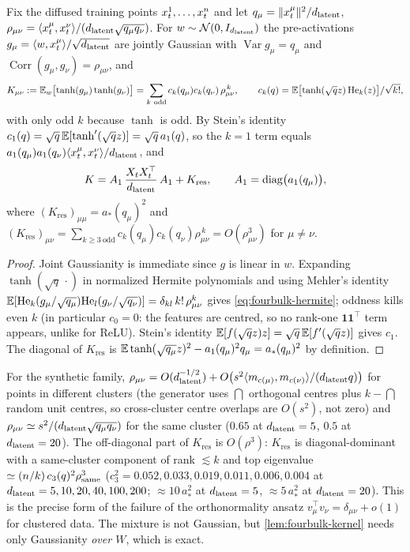 \begin{lemma}\label{lem:fourbulk-kernel}
Fix the diffused training points $x_t^1,\dots,x_t^n$ and let $q_\mu=\|x_t^\mu\|^2/d_{\mathrm{latent}}$, $\rho_{\mu\nu}=\langle x_t^\mu,x_t^\nu\rangle/(d_{\mathrm{latent}}\sqrt{q_\mu q_\nu})$. For $w\sim\mathcal N(0,I_{d_{\mathrm{latent}}})$ the pre-activations $g_\mu=\langle w,x_t^\mu\rangle/\sqrt{d_{\mathrm{latent}}}$ are jointly Gaussian with $\operatorname{Var}g_\mu=q_\mu$ and $\operatorname{Corr}(g_\mu,g_\nu)=\rho_{\mu\nu}$, and
\begin{equation}\label{eq:fourbulk-hermite}
  K_{\mu\nu}:=\mathbb{E}_w\bigl[\tanh(g_\mu)\tanh(g_\nu)\bigr]
  =\sum_{k\ \mathrm{odd}} c_k(q_\mu)c_k(q_\nu)\,\rho_{\mu\nu}^{\,k},\qquad
  c_k(q)=\mathbb{E}\bigl[\tanh(\sqrt q z)\,\mathrm{He}_k(z)\bigr]/\sqrt{k!},
\end{equation}
with only odd $k$ because $\tanh$ is odd. By Stein's identity $c_1(q)=\sqrt q\,\mathbb{E}[\tanh'(\sqrt q z)]=\sqrt q\,a_1(q)$, so the $k=1$ term equals $a_1(q_\mu)a_1(q_\nu)\langle x_t^\mu,x_t^\nu\rangle/d_{\mathrm{latent}}$, and
\begin{equation}\label{eq:fourbulk-Ksplit}
  K = A_1\,\frac{X_tX_t^\top}{d_{\mathrm{latent}}}\,A_1 + K_{\mathrm{res}},\qquad A_1=\operatorname{diag}\bigl(a_1(q_\mu)\bigr),
\end{equation}
where $(K_{\mathrm{res}})_{\mu\mu}=a_*(q_\mu)^2$ and $(K_{\mathrm{res}})_{\mu\nu}=\sum_{k\ge3\ \mathrm{odd}}c_k(q_\mu)c_k(q_\nu)\rho_{\mu\nu}^{\,k}=O(\rho_{\mu\nu}^3)$ for $\mu\ne\nu$.
\end{lemma}
\begin{proof}
Joint Gaussianity is immediate since $g$ is linear in $w$. Expanding $\tanh(\sqrt{q}\,\cdot)$ in normalized Hermite polynomials and using Mehler's identity $\mathbb{E}[\mathrm{He}_k(g_\mu/\sqrt{q_\mu})\mathrm{He}_l(g_\nu/\sqrt{q_\nu})]=\delta_{kl}\,k!\,\rho_{\mu\nu}^k$ gives \eqref{eq:fourbulk-hermite}; oddness kills even $k$ (in particular $c_0=0$: the features are centred, so no rank-one $\mathbf 1\mathbf 1^\top$ term appears, unlike for ReLU). Stein's identity $\mathbb{E}[f(\sqrt q z)z]=\sqrt q\,\mathbb{E}[f'(\sqrt q z)]$ gives $c_1$. The diagonal of $K_{\mathrm{res}}$ is $\mathbb{E}\tanh(\sqrt{q_\mu}z)^2-a_1(q_\mu)^2q_\mu=a_*(q_\mu)^2$ by definition.
\end{proof}

For the synthetic family, $\rho_{\mu\nu}=O(d_{\mathrm{latent}}^{-1/2})+O\bigl(s^2\langle m_{c(\mu)},m_{c(\nu)}\rangle/(d_{\mathrm{latent}} q)\bigr)$ for points in different clusters (the generator uses $\dint$ orthogonal centres plus $k-\dint$ random unit centres, so cross-cluster centre overlaps are $O(s^2)$, not zero) and $\rho_{\mu\nu}\simeq s^2/(d_{\mathrm{latent}}\sqrt{q_\mu q_\nu})$ for the same cluster ($0.65$ at $d_{\mathrm{latent}}=5$, $0.5$ at $d_{\mathrm{latent}}=20$). The off-diagonal part of $K_{\mathrm{res}}$ is $O(\rho^3)$: $K_{\mathrm{res}}$ is diagonal-dominant with a same-cluster component of rank $\lesssim k$ and top eigenvalue $\simeq(n/k)\,c_3(q)^2\rho_{\mathrm{same}}^3$ ($c_3^2=0.052,0.033,0.019,0.011,0.006,0.004$ at $d_{\mathrm{latent}}=5,10,20,40,100,200$; $\approx10\,a_*^2$ at $d_{\mathrm{latent}}=5$, $\approx5\,a_*^2$ at $d_{\mathrm{latent}}=20$). This is the precise form of the failure of the orthonormality ansatz $v_\mu^\top v_\nu=\delta_{\mu\nu}+o(1)$ for clustered data. The mixture is not Gaussian, but \cref{lem:fourbulk-kernel} needs only Gaussianity \emph{over $W$}, which is exact.


